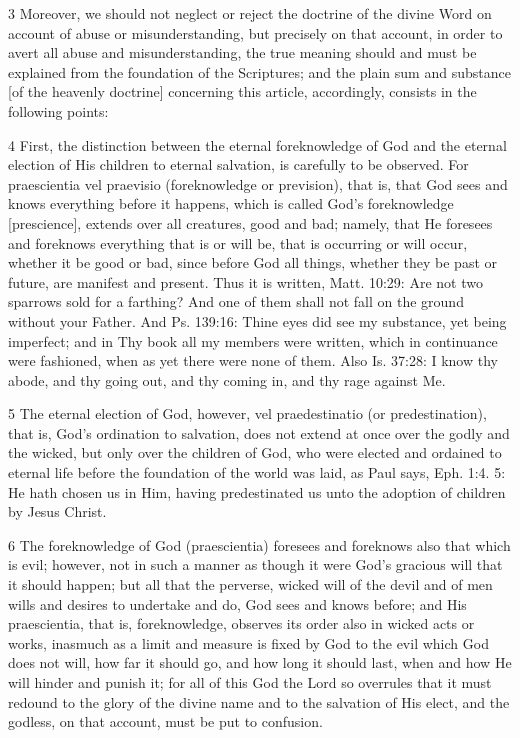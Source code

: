 {3 Moreover, we should not neglect or reject the doctrine of the divine Word on account of abuse or misunderstanding, but precisely on that account, in order to avert all abuse and misunderstanding, the true meaning should and must be explained from the foundation of the Scriptures; and the plain sum and substance [of the heavenly doctrine] concerning this article, accordingly, consists in the following points:

4 First, the distinction between the eternal foreknowledge of God and the eternal election of His children to eternal salvation, is carefully to be observed. For praescientia vel praevisio (foreknowledge or prevision), that is, that God sees and knows everything before it happens, which is called God’s foreknowledge [prescience], extends over all creatures, good and bad; namely, that He foresees and foreknows everything that is or will be, that is occurring or will occur, whether it be good or bad, since before God all things, whether they be past or future, are manifest and present. Thus it is written, Matt. 10:29: Are not two sparrows sold for a farthing? And one of them shall not fall on the ground without your Father. And Ps. 139:16: Thine eyes did see my substance, yet being imperfect; and in Thy book all my members were written, which in continuance were fashioned, when as yet there were none of them. Also Is. 37:28: I know thy abode, and thy going out, and thy coming in, and thy rage against Me.

5 The eternal election of God, however, vel praedestinatio (or predestination), that is, God’s ordination to salvation, does not extend at once over the godly and the wicked, but only over the children of God, who were elected and ordained to eternal life before the foundation of the world was laid, as Paul says, Eph. 1:4. 5: He hath chosen us in Him, having predestinated us unto the adoption of children by Jesus Christ.

6 The foreknowledge of God (praescientia) foresees and foreknows also that which is evil; however, not in such a manner as though it were God’s gracious will that it should happen; but all that the perverse, wicked will of the devil and of men wills and desires to undertake and do, God sees and knows before; and His praescientia, that is, foreknowledge, observes its order also in wicked acts or works, inasmuch as a limit and measure is fixed by God to the evil which God does not will, how far it should go, and how long it should last, when and how He will hinder and punish it; for all of this God the Lord so overrules that it must redound to the glory of the divine name and to the salvation of His elect, and the godless, on that account, must be put to confusion.

}

